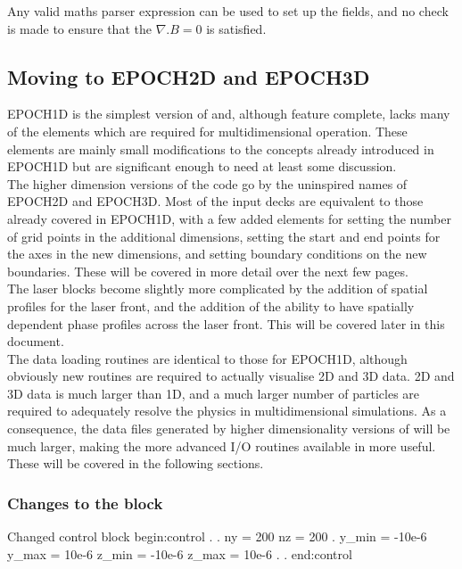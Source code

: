 Any valid maths parser expression can be used to set up the fields, and no
check is made to ensure that the $\nabla.B = 0$ is satisfied. \\

\subsection{Moving to EPOCH2D and EPOCH3D}
EPOCH1D is the simplest version of {\EPOCH} and, although feature complete,
lacks many of the elements which are required for multidimensional operation.
These elements are mainly small modifications to the concepts already
introduced in EPOCH1D but are significant enough to need at least some
discussion.\\

The higher dimension versions of the code go by the uninspired names of EPOCH2D
and EPOCH3D. Most of the input decks are equivalent to those already covered in
EPOCH1D, with a few added elements for setting the number of grid points in the
additional dimensions, setting the start and end points for the axes in the new
dimensions, and setting boundary conditions on the new boundaries. These will
be covered in more detail over the next few pages.\\

The laser blocks become slightly more complicated by the addition of spatial
profiles for the laser front, and the addition of the ability to have spatially
dependent phase profiles across the laser front. This will be covered later in
this document.\\

The data loading routines are identical to those for EPOCH1D, although
obviously new routines are required to actually visualise 2D and 3D data. 2D
and 3D data is much larger than 1D, and a much larger number of particles are
required to adequately resolve the physics in multidimensional simulations. As
a consequence, the data files generated by higher dimensionality versions of
{\EPOCH} will be much larger, making the more advanced I/O routines available
in {\EPOCH} more useful. These will be covered in the following sections.\\

\subsubsection{Changes to the  block}

\begin{lboxverbatim}{Changed control block}
begin:control
   .
   .
   ny = 200
   nz = 200
   .
   y_min = -10e-6
   y_max = 10e-6
   z_min = -10e-6
   z_max = 10e-6
   .
   .
end:control
\end{lboxverbatim}

